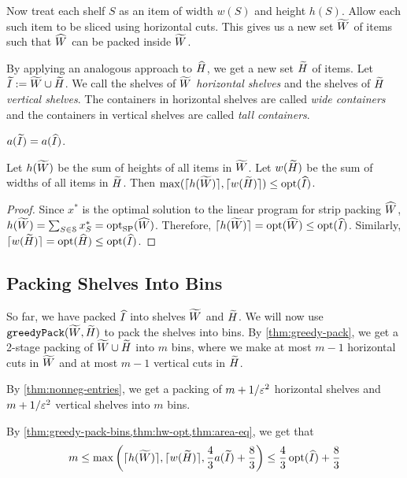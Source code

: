 Now treat each shelf $S$ as an item of width $w(S)$ and height $h(S)$.
Allow each such item to be sliced using horizontal cuts.
This gives us a new set $\widetilde{W}$ of items such that $\widehat{W}$ can be packed inside $\widetilde{W}$.

By applying an analogous approach to $\widehat{H}$, we get a new set $\widetilde{H}$ of items.
Let $\widetilde{I} := \widetilde{W} \cup \widetilde{H}$.
We call the shelves of $\widetilde{W}$ \emph{horizontal shelves} and the shelves of $\widetilde{H}$
\emph{vertical shelves}. The containers in horizontal shelves are called \emph{wide containers}
and the containers in vertical shelves are called \emph{tall containers}.

\begin{claim}
\label{thm:area-eq}
$a(\widetilde{I}) = a(\widehat{I})$.
\end{claim}
\begin{lemma}
\label{thm:hw-opt}
Let $h(\widetilde{W})$ be the sum of heights of all items in $\widetilde{W}$.
Let $w(\widetilde{H})$ be the sum of widths of all items in $\widetilde{H}$.
Then $\max(\lceil h(\widetilde{W}) \rceil, \lceil w(\widetilde{H}) \rceil) \le \operatorname{opt}(\widehat{I})$.
\end{lemma}
\begin{proof}
Since $x^*$ is the optimal solution to the linear program for strip packing $\widehat{W}$,
$h(\widetilde{W}) = \sum_{S \in \mathcal{S}} x^*_S = \operatorname{opt}_{\mathrm{SP}}(\widehat{W})$.
Therefore, $\lceil h(\widetilde{W}) \rceil = \operatorname{opt}(\widehat{W}) \le \operatorname{opt}(\widehat{I})$.
Similarly, $\lceil w(\widetilde{H}) \rceil = \operatorname{opt}(\widehat{H}) \le \operatorname{opt}(\widehat{I})$.
\end{proof}

\subsection{Packing Shelves Into Bins}
\label{sec:bp-algo:pack-shelves-into-bins}

So far, we have packed $\widehat{I}$ into shelves $\widetilde{W}$ and $\widetilde{H}$.
We will now use $\operatorname{\mathtt{greedyPack}}(\widetilde{W}, \widetilde{H})$ to pack the shelves into bins.
By \cref{thm:greedy-pack}, we get a 2-stage packing of $\widetilde{W} \cup \widetilde{H}$
into $m$ bins, where we make at most $m-1$ horizontal cuts in $\widetilde{W}$
and at most $m-1$ vertical cuts in $\widetilde{H}$.

By \cref{thm:nonneg-entries}, we get a packing of $m+1/\varepsilon^2$ horizontal shelves
and $m+1/\varepsilon^2$ vertical shelves into $m$ bins.

By \cref{thm:greedy-pack-bins,thm:hw-opt,thm:area-eq}, we get that
\[ m \le \max\left(\lceil h(\widetilde{W}) \rceil, \lceil w(\widetilde{H}) \rceil,
    \frac{4}{3}a(\widetilde{I}) + \frac{8}{3}\right)
\le \frac{4}{3}\operatorname{opt}(\widehat{I}) + \frac{8}{3} \]


